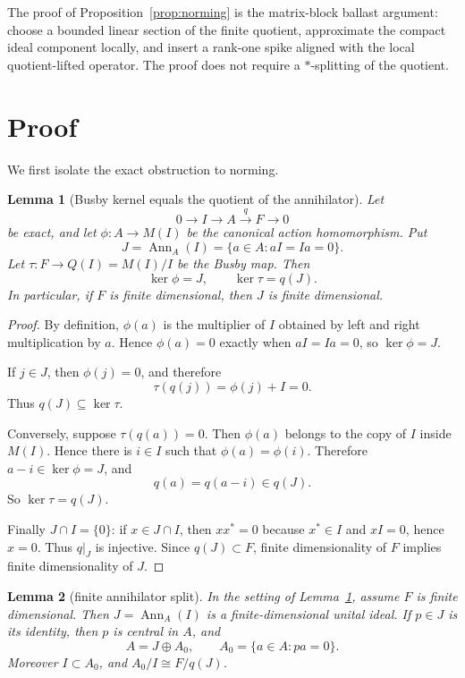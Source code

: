 \documentclass[11pt]{article}
\newtheorem{lemma}{Lemma}
\newcommand{\Ann}{\operatorname{Ann}}
\begin{document}
The proof of Proposition~\ref{prop:norming} is the matrix-block ballast
argument: choose a bounded linear section of the finite quotient, approximate
the compact ideal component locally, and insert a rank-one spike aligned with
the local quotient-lifted operator.  The proof does not require a
\(*\)-splitting of the quotient.

\section*{Proof}

We first isolate the exact obstruction to norming.

\begin{lemma}[Busby kernel equals the quotient of the annihilator]
\label{lem:busby-kernel}
Let
\[
        0\longrightarrow I\longrightarrow A
        \stackrel{q}{\longrightarrow} F\longrightarrow0
\]
be exact, and let \(\phi:A\to M(I)\) be the canonical action homomorphism.
Put
\[
        J=\Ann_A(I)=\{a\in A:aI=Ia=0\}.
\]
Let \(\tau:F\to Q(I)=M(I)/I\) be the Busby map.  Then
\[
        \ker\phi=J,
        \qquad
        \ker\tau=q(J).
\]
In particular, if \(F\) is finite dimensional, then \(J\) is finite
dimensional.
\end{lemma}

\begin{proof}
By definition, \(\phi(a)\) is the multiplier of \(I\) obtained by left and
right multiplication by \(a\).  Hence \(\phi(a)=0\) exactly when \(aI=Ia=0\),
so \(\ker\phi=J\).

If \(j\in J\), then \(\phi(j)=0\), and therefore
\[
        \tau(q(j))=\phi(j)+I=0.
\]
Thus \(q(J)\subseteq\ker\tau\).

Conversely, suppose \(\tau(q(a))=0\).  Then \(\phi(a)\) belongs to the copy of
\(I\) inside \(M(I)\).  Hence there is \(i\in I\) such that
\(\phi(a)=\phi(i)\).  Therefore \(a-i\in\ker\phi=J\), and
\[
        q(a)=q(a-i)\in q(J).
\]
So \(\ker\tau=q(J)\).

Finally \(J\cap I=\{0\}\): if \(x\in J\cap I\), then \(x x^*=0\) because
\(x^*\in I\) and \(xI=0\), hence \(x=0\).  Thus \(q|_J\) is injective.  Since
\(q(J)\subset F\), finite dimensionality of \(F\) implies finite dimensionality
of \(J\).
\end{proof}

\begin{lemma}[finite annihilator split]
\label{lem:split}
In the setting of Lemma~\ref{lem:busby-kernel}, assume \(F\) is finite
dimensional.  Then \(J=\Ann_A(I)\) is a finite-dimensional unital ideal.  If
\(p\in J\) is its identity, then \(p\) is central in \(A\), and
\[
        A=J\oplus A_0,
        \qquad
        A_0=\{a\in A:pa=0\}.
\]
Moreover \(I\subset A_0\), and \(A_0/I\cong F/q(J)\).
\end{lemma}
\end{document}
